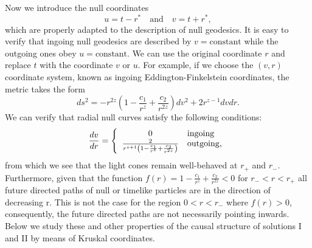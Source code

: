 \documentclass[sn-mathphys,Numbered]{sn-jnl}%
\theoremstyle{thmstyleone}%
\theoremstyle{thmstyletwo}%
\theoremstyle{thmstylethree}%
\begin{document}
Now we introduce the null coordinates  
\begin{equation} \label{u and v}
u=t-r^* \quad   \text{and}\quad v=t+r^*,
\end{equation}
  which are properly adapted to the description of null geodesics. It is easy to verify that ingoing null geodesics are described by $v=\text{constant}$ while the outgoing ones obey $u=\text{constant}$. We can use the original coordinate $r$ and replace $t$ with the coordinate $v$ or $u$. For example, if we choose the $(v,r)$ coordinate system, known as ingoing Eddington-Finkelstein coordinates, the metric takes the form
\begin{equation}
        ds^{2}=-r^{2z}\left(1-\frac{c_{1}}{r^{z}}+\frac{c_{2}}{r^{2z}}\right)dv^2+2r^{z-1}dvdr.
\end{equation}
%
We can verify that radial null curves satisfy the following conditions:
%
\begin{equation}
        \frac{dv}{dr}=\left\{ \begin{array}{c l} 0 & \text{ingoing} \\\frac{2}{r^{z+1}\left(1-\frac{c_{1}}{r^{z}}+\frac{c_{2}}{r^{2z}}\right)} & \text{outgoing,} \end{array}\right.
\end{equation}
from which we see that the light cones remain well-behaved at $r_+$ and $r_-$. Furthermore, given that the function $f(r)=1-\frac{c_{1}}{r^{z}}+\frac{c_{2}}{r^{2z}}<0$ for $r_-<r<r_+$ all future directed paths of null or timelike particles are in the direction of decreasing r. This is not the case for the region $0<r<r_-$ where $f(r)>0$, consequently, the future directed paths are not necessarily pointing inwards. Below we study these and other properties of the causal structure of solutions I and II by means of Kruskal coordinates.
\end{document}
